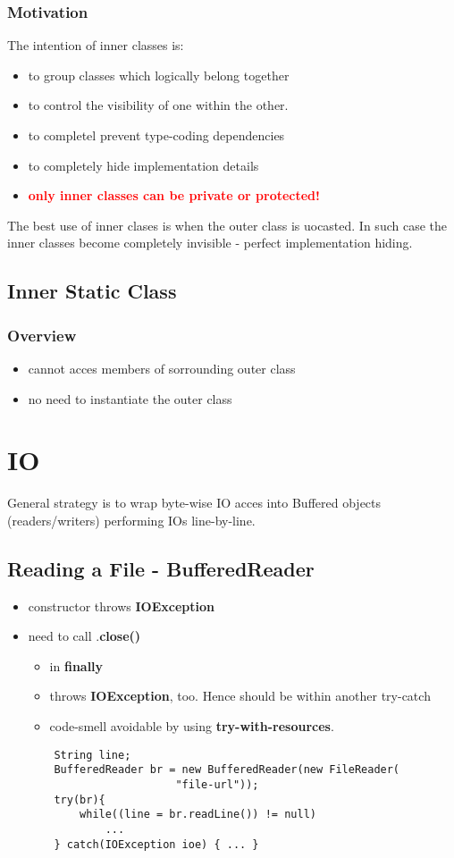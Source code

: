 \documentclass{report}
\begin{document}
\section{Motivation}
The intention of inner classes is:
\begin{itemize}
	\item  to group classes which logically belong together
	\item to control the visibility of one within the other.
	\item to completel prevent type-coding dependencies
	\item to completely hide implementation details
	\item \textbf{\textcolor{red}{only inner classes can be private or protected!}}
\end{itemize}
The best use of inner clases is when the outer class is uocasted. In such case the inner classes become completely invisible - 
perfect implementation hiding.


\chapter{Inner Static Class}
\section{Overview}
\begin{itemize}
	\item cannot acces members of sorrounding outer class
	\item no need to instantiate the outer class
\end{itemize}

\part{IO}

General strategy is to wrap byte-wise IO acces  into Buffered objects (readers/writers)
performing IOs line-by-line.

\chapter{Reading a File - BufferedReader}
\begin{itemize}
	\item constructor throws \textbf{IOException}
	\item need to call .\textbf{close() }
		\begin{itemize}
			\item in \textbf{finally}
			\item throws \textbf{IOException}, too. Hence should be within another try-catch
			\item code-smell avoidable by using \textbf{try-with-resources}.
		\end{itemize}
	
	\begin{verbatim}
	String line;
	BufferedReader br = new BufferedReader(new FileReader(
	                   "file-url"));
	try(br){
		while((line = br.readLine()) != null)
			...
	} catch(IOException ioe) { ... }
	\end{verbatim}
\end{itemize}
\end{document}
